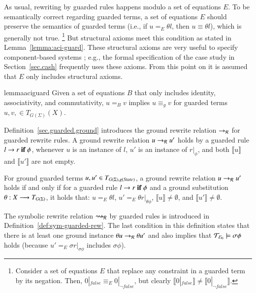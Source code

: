 As usual, rewriting by guarded rules happens modulo a set of equations
$E$.  To be semantically correct regarding guarded terms, a set of
equations $E$ should preserve the semantics of guarded terms (i.e., if
$u =_E \theta l$, then $u \equiv \theta l$), which is generally not
true.%
\footnote{Consider a set of equations $E$ that replace any constraint in a guarded term by its negation.
Then, $0 |_{\mathit{false}} \equiv_E 0 |_{\neg \mathit{false}}$,
but clearly $\llbracket 0 |_{\mathit{false}} \rrbracket \neq  \llbracket 0 |_{\neg \mathit{false}} \rrbracket$.}
But structural axioms meet this condition as stated in
Lemma~\ref{lemma:aci-guard}. 
%
These structural axioms are very useful to specify component-based systems \cite{clavel-maudebook-2007};
e.g., the formal specification of the case study in Section~\ref{sec.cash} frequently uses these axioms.
%
From this point on it is assumed that $E$
only includes structural axioms.


\begin{restatable}{lemma}{aciguard}
\label{lemma:aci-guard}
Given a set of equations $B$ that only includes identity,
associativity, and commutativity, $u =_B v$ implies $u \equiv_g v$ for
guarded terms $u, v, \in T_{G(\Sigma)}(X)$.
\end{restatable}
\noindent 


Definition~\ref{sec.guarded.ground} introduces the ground rewrite
relation $\to_{\mathcal{R}}$ for guarded rewrite rules.  A ground rewrite
relation $u \to_{\mathcal{R}} u'$ holds by a guarded rule $l \rightarrow r\;\textnormal{\bf if}\; {\phi}$,
whenever $u$ is an instance of $l$, $u'$ is an instance of $r
|_{\phi}$, and both $\llbracket u \rrbracket$ and $\llbracket u'
\rrbracket$ are not empty.

\begin{definition}\label{sec.guarded.ground}
For ground guarded terms $u, u' \in T_{G(\Sigma),g(\textit{State})}$,
a ground rewrite relation $u \to_{\mathcal{R}} u'$ holds  if and only if for a guarded rule
$l \rightarrow r\;\textnormal{\bf if}\; {\phi}$ and a ground substitution
$\theta : X \longrightarrow T_{G(\Sigma)}$,
it holds that: $u =_E \theta l$, $u' =_E \theta r
|_{\theta \phi}$, $\llbracket u \rrbracket \neq \emptyset$, and
$\llbracket u' \rrbracket \neq \emptyset$.
\end{definition}

The symbolic rewrite relation $\rightsquigarrow_{\mathcal{R}}$ by guarded rules %
is introduced in
Definition~\ref{def:sym-guarded-rew}.  The last condition in this
definition states that there is at least one ground instance $\theta u
\to_{\mathcal{R}} \theta u'$ and also implies that $\mathcal{T}_{\mathcal{E}_{0}} \models \sigma \phi$
holds (because $u' =_E \sigma r |_{\sigma \phi}$ includes $\sigma
\phi$).

